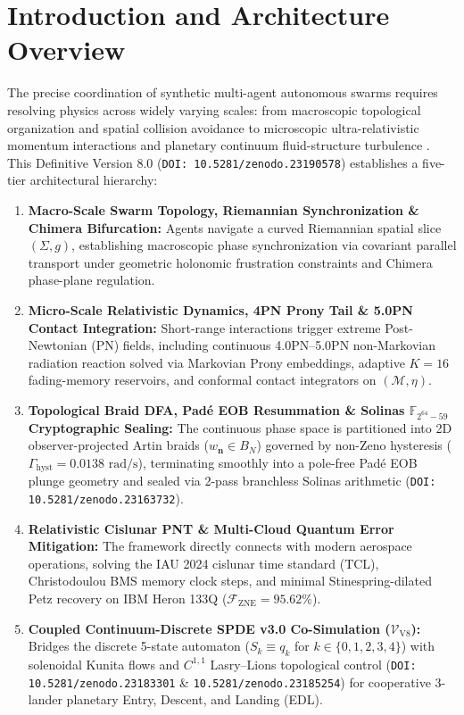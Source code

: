 \documentclass[11pt,a4paper,reqno]{article}
\theoremstyle{plain}
\theoremstyle{definition}
\theoremstyle{remark}
\numberwithin{equation}{section}
\begin{document}
\newpage
\tableofcontents
\newpage

\section{Introduction and Architecture Overview}
The precise coordination of synthetic multi-agent autonomous swarms requires resolving physics across widely varying scales: from macroscopic topological organization and spatial collision avoidance to microscopic ultra-relativistic momentum interactions and planetary continuum fluid-structure turbulence \cite{UnmaniV7Automata2026,UnmaniV6Automata2026,UnmaniV7Synthesis2026,Ananda2026V5,Ananda2026SpdeV30}. This Definitive Version 8.0 (\texttt{DOI: 10.5281/zenodo.23190578}) establishes a five-tier architectural hierarchy:
\begin{enumerate}
    \item \textbf{Macro-Scale Swarm Topology, Riemannian Synchronization \& Chimera Bifurcation:} Agents navigate a curved Riemannian spatial slice $(\Sigma, g)$, establishing macroscopic phase synchronization via covariant parallel transport under geometric holonomic frustration constraints and Chimera phase-plane regulation.
    \item \textbf{Micro-Scale Relativistic Dynamics, 4PN Prony Tail \& 5.0PN Contact Integration:} Short-range interactions trigger extreme Post-Newtonian (PN) fields, including continuous 4.0PN--5.0PN non-Markovian radiation reaction solved via Markovian Prony embeddings, adaptive $K=16$ fading-memory reservoirs, and conformal contact integrators on $(\mathcal{M}, \eta)$.
    \item \textbf{Topological Braid DFA, Padé EOB Resummation \& Solinas $\mathbb{F}_{2^{64}-59}$ Cryptographic Sealing:} The continuous phase space is partitioned into 2D observer-projected Artin braids ($w_{\mathbf{n}} \in B_N$) governed by non-Zeno hysteresis ($\Gamma_{\mathrm{hyst}} = 0.0138\text{ rad/s}$), terminating smoothly into a pole-free Padé EOB plunge geometry and sealed via 2-pass branchless Solinas arithmetic (\texttt{DOI: 10.5281/zenodo.23163732}).
    \item \textbf{Relativistic Cislunar PNT \& Multi-Cloud Quantum Error Mitigation:} The framework directly connects with modern aerospace operations, solving the IAU 2024 cislunar time standard ($\mathrm{TCL}$), Christodoulou BMS memory clock steps, and minimal Stinespring-dilated Petz recovery on IBM Heron 133Q ($\mathcal{F}_{\mathrm{ZNE}} = 95.62\%$).
    \item \textbf{Coupled Continuum-Discrete SPDE v3.0 Co-Simulation ($\mathcal{V}_{\mathrm{V8}}$):} Bridges the discrete 5-state automaton ($S_k \equiv q_k$ for $k \in \{0,1,2,3,4\}$) with solenoidal Kunita flows and $C^{1,1}$ Lasry--Lions topological control (\texttt{DOI: 10.5281/zenodo.23183301} \& \texttt{10.5281/zenodo.23185254}) for cooperative 3-lander planetary Entry, Descent, and Landing (EDL).
\end{enumerate}
\end{document}
